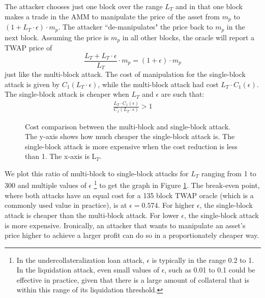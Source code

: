 The attacker chooses just one block over the range $L_T$ and in that one block makes a trade in the AMM to manipulate the price of the asset from $m_p$ to $(1 + L_T \cdot \epsilon) \cdot m_p$. The attacker ``de-manipulates" the price back to $m_p$ in the next block. Assuming the price is $m_p$ in all other blocks, the oracle will report a TWAP price of $$\frac{ L_{T} + L_T \cdot \epsilon}{L_{T}}\cdot m_p = (1+\epsilon)\cdot m_p$$ just like the multi-block attack. The cost of manipulation for the single-block attack is given by $C_1(L_T \cdot \epsilon)$, while the multi-block attack had cost $L_T \cdot C_1(\epsilon)$. The single-block attack is cheaper when $L_T$ and $\epsilon$ are such that:
\begin{align}
   \frac{L_T \cdot C_1(\epsilon)}{C_1(L_T \cdot \epsilon)} > 1
   \label{OneBlockCheaperEq}
\end{align}
\begin{figure}[h]
\caption{Cost comparison between the multi-block and single-block attack. The y-axis shows how much cheaper the single-block attack is. The single-block attack is more expensive when the cost reduction is less than 1. The x-axis is L$_T$.}
\label{figureCostDiff}
\end{figure}
We plot this ratio of multi-block to single-block attacks for $L_T$ ranging from 1 to 300 and multiple values of $\epsilon$ \footnote{In the undercollateralization loan attack, $\epsilon$ is typically in the range 0.2 to 1. In the liquidation attack, even small values of $\epsilon$, such as 0.01 to 0.1 could be effective
in practice, given that there is a large amount of collateral that is within this range of its liquidation threshold.} to get the graph in Figure \ref{figureCostDiff}. The break-even point, where both attacks have an equal cost for a 135 block TWAP oracle (which is a commonly used value in practice), is at $\epsilon = 0.574$. For higher $\epsilon$, the single-block attack is cheaper than the multi-block attack. For lower $\epsilon$, the single-block attack is more expensive. Ironically, an attacker that wants to manipulate an asset's price higher to achieve a larger profit can do so in a proportionately cheaper way. 

